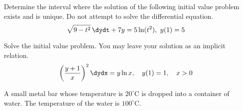 \documentclass[12pt]{exam}
\begin{document}
    


\newpage

\begin{questions}


\newpage 

\question[3] Determine the interval where the solution of the following initial value problem exists and is unique. Do not attempt to solve the differential equation. $$\sqrt{9-t^2} \, \dydt + 7 y= 5 \ln(t^2), \ y(1) = 5$$ %

\vspace{3cm}

\question[7] Solve the initial value problem.  You may leave your solution as an implicit relation. $$ \left(\frac{y+1}{x}\right)^2 \dydx = y \ln x, \quad y(1)  = 1, \quad x > 0$$ %





    \newpage
    \question[10] A small metal bar whose temperature is $20^{\circ}$C is dropped into a container of water. The temperature of the water is $100^{\circ}$C.  %


\end{questions}
\end{document}

